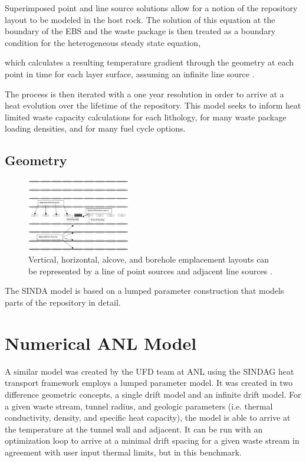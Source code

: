 \documentclass{anstrans}
\begin{document}
Superimposed point and line source solutions allow for a notion of the 
repository layout to be modeled in the host rock. The solution of this equation 
at the boundary of the EBS and the waste package is then treated as a boundary 
condition for the heterogeneous steady state equation, 

which calculates a resulting temperature gradient through the geometry at each 
point in time for each layer surface, assuming an infinite line source 
\cite{hardin_generic_2011}.

The process is then iterated with a one year resolution in order to arrive at a 
heat evolution over  the lifetime of the repository. This model seeks to inform 
heat limited waste capacity calculations for each lithology, for many waste 
package loading densities, and for many fuel cycle options.  


\subsection{Geometry}

\begin{figure}[h!]
  \begin{center}
    \includegraphics[width=0.4\textwidth]{llnlConcept.eps}
  \end{center}
  \caption{Vertical, horizontal, alcove, and borehole emplacement layouts can be 
  represented by a line of point sources and adjacent line sources 
  \cite{sutton_investigations_2011}.}
  \label{fig:llnl}
\end{figure}


The SINDA model is based on a lumped parameter construction that models parts of 
the repository in detail. 
\section{Numerical ANL Model}

A similar model was created by the UFD team at \gls{ANL} using the \gls{SINDAG} 
heat transport framework employs a lumped parameter model. It was created in two  
difference geometric concepts, a single drift model and an infinite drift model.  
For a given waste stream, tunnel radius, and geologic parameters (i.e.  thermal 
conductivity, density, and specific heat capacity), the model is able to arrive  
at the temperature at the tunnel wall and adjacent. It can be run with an 
optimization loop to arrive at a minimal drift spacing for a given waste stream 
in agreement with user input thermal limits, but in this benchmark. 
\end{document}
